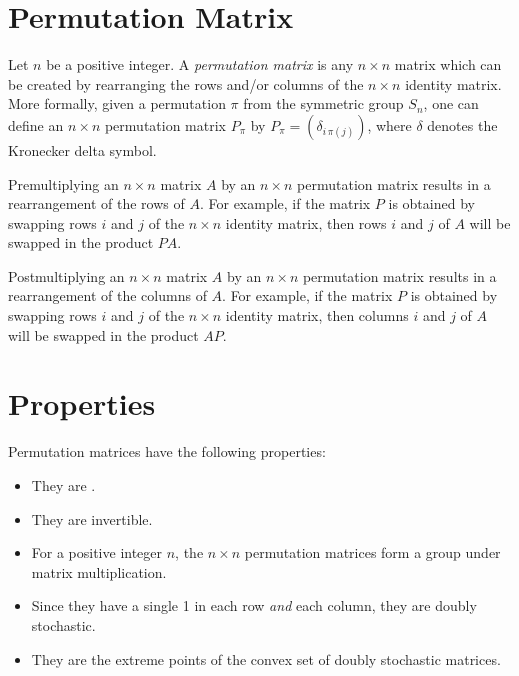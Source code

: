 \documentclass{article}
\begin{document}

\section{Permutation Matrix}

Let $n$ be a positive integer.  A \emph{permutation matrix} is any $n\times n$ matrix which can be created by rearranging the rows and/or columns of the $n\times n$ identity matrix.  More formally, given a permutation $\pi$ from the symmetric group $S_n$, one can define an $n\times n$ permutation matrix $P_{\pi}$ by $P_{\pi}=(\delta_{i\, \pi(j)})$, where $\delta$ denotes the Kronecker delta symbol.  

Premultiplying an $n\times n$ matrix $A$ by an $n\times n$ permutation matrix results in a rearrangement of the rows of $A$.  For example, if the matrix $P$ is obtained by swapping rows $i$ and $j$ of the $n \times n$ identity matrix, then rows $i$ and $j$ of $A$ will be swapped in the product $PA$.

Postmultiplying an $n\times n$ matrix $A$ by an $n\times n$ permutation matrix results in a rearrangement of the columns of $A$.  For example, if the matrix $P$ is obtained by swapping rows $i$ and $j$ of the $n \times n$ identity matrix, then columns $i$ and $j$ of $A$ will be swapped in the product $AP$.

\section{Properties}

Permutation matrices have the following properties:

\begin{itemize}
\item They are .
\item They are invertible.
\item For a  positive integer $n$, the $n \times n$ permutation matrices form a group under matrix multiplication.
\item Since they have a single 1 in each row \emph{and} each column, they are doubly stochastic.
\item They are the extreme points of the convex set of doubly stochastic matrices.
\end{itemize}
\end{document}
